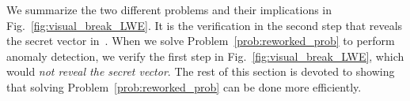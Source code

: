 \documentclass[journal, twoside, web]{ieeecolorpreprint}
\begin{document}

We summarize the two different problems and their implications in Fig.~\ref{fig:visual_break_LWE}. It is the verification in the second step that reveals the secret vector in~\cite{regev2009}. When we solve Problem~\ref{prob:reworked_prob} to perform anomaly detection, we verify the first step in Fig.~\ref{fig:visual_break_LWE}, which would \emph{not reveal the secret vector}. The rest of this section is devoted to showing that solving Problem~\ref{prob:reworked_prob} can be done more efficiently.



\end{document}
